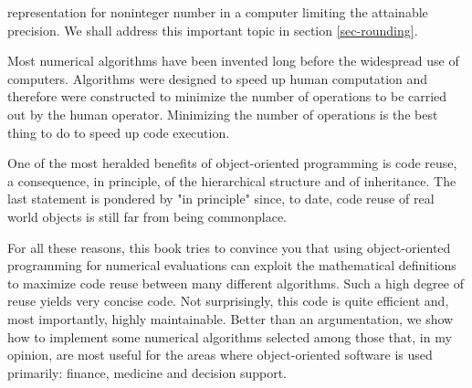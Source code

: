 representation for noninteger number in a computer limiting the
attainable precision. We shall address this important topic in
section \ref{sec-rounding}.
\par
Most numerical algorithms have been invented long before the widespread use of computers. Algorithms were designed to speed up
human computation and therefore were constructed to minimize
the number of operations to be carried out by the human operator.
Minimizing the number of operations is the best thing to do to
speed up code execution.
\par
One of the most heralded benefits of object-oriented programming
is code reuse, a consequence, in principle, of the hierarchical
structure and of inheritance. The last statement is pondered by
"in principle" since, to date, code reuse of real world objects is
still far from being commonplace.
\par
For all these reasons, this book tries to convince you that using
object-oriented programming for numerical evaluations can exploit
the mathematical definitions to maximize code reuse between many
different algorithms. Such a high degree of reuse yields very
concise code. Not surprisingly, this code is quite efficient and,
most importantly, highly maintainable. Better than an
argumentation, we show how to implement some numerical algorithms
selected among those that, in my opinion, are most useful for the areas
where object-oriented software is used primarily: finance,
medicine and decision support.

